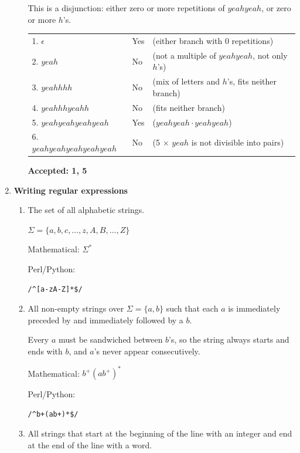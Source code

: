 \documentclass[11pt]{article}
\begin{document}
\begin{enumerate}
\begin{enumerate}
This is a disjunction: either zero or more repetitions of $yeahyeah$, or zero or more $h$'s.

\begin{tabular}{lll}
1. $\epsilon$ & Yes & (either branch with 0 repetitions) \\
2. $yeah$ & No & (not a multiple of $yeahyeah$, not only $h$'s) \\
3. $yeahhhh$ & No & (mix of letters and $h$'s, fits neither branch) \\
4. $yeahhhyeahh$ & No & (fits neither branch) \\
5. $yeahyeahyeahyeah$ & Yes & ($yeahyeah \cdot yeahyeah$) \\
6. $yeahyeahyeahyeahyeah$ & No & (5 $\times$ $yeah$ is not divisible into pairs) \\
\end{tabular}

\textbf{Accepted: 1, 5}

\end{enumerate}

\item \textbf{Writing regular expressions}

\begin{enumerate}

\item The set of all alphabetic strings.

$\Sigma = \{a, b, c, \ldots, z, A, B, \ldots, Z\}$

Mathematical: $\Sigma^*$

Perl/Python:
\begin{verbatim}
/^[a-zA-Z]*$/
\end{verbatim}

\item All non-empty strings over $\Sigma = \{a, b\}$ such that each $a$ is immediately preceded by and immediately followed by a $b$.

Every $a$ must be sandwiched between $b$'s, so the string always starts and ends with $b$, and $a$'s never appear consecutively.

Mathematical: $b^+(ab^+)^*$

Perl/Python:
\begin{verbatim}
/^b+(ab+)*$/
\end{verbatim}

\item All strings that start at the beginning of the line with an integer and end at the end of the line with a word.


\end{enumerate}
\end{enumerate}
\end{document}
